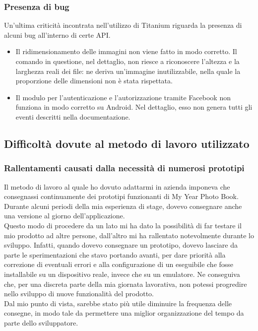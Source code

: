 			\subsubsection{Presenza di bug}
				Un'ultima criticità incontrata nell'utilizzo di Titanium riguarda la presenza di alcuni bug all'interno di certe API.
				\begin{itemize}
					\item Il ridimensionamento delle immagini non viene fatto in modo corretto. Il comando in questione, nel
					dettaglio, non riesce a riconoscere l'altezza e la larghezza reali dei file: ne deriva un'immagine
					inutilizzabile, nella quale la proporzione delle dimensioni non è stata rispettata.
					\item Il modulo per l'autenticazione e l'autorizzazione tramite Facebook non funziona in modo corretto su
					Android. Nel dettaglio, esso non genera tutti gli eventi descritti nella documentazione.
				\end{itemize}
		\subsection{Difficoltà dovute al metodo di lavoro utilizzato}
			\subsubsection{Rallentamenti causati dalla necessità di numerosi prototipi}
				Il metodo di lavoro al quale ho dovuto adattarmi in azienda imponeva che consegnassi continuamente dei prototipi
				funzionanti di My Year Photo Book. Durante alcuni periodi della mia esperienza di stage, dovevo consegnare anche una
				versione al giorno dell'applicazione.\\
				Questo modo di procedere da un lato mi ha dato la possibilità di far testare il mio prodotto ad altre persone,
				dall'altro mi ha rallentato notevolmente durante lo sviluppo. Infatti, quando dovevo consegnare un prototipo, dovevo
				lasciare da parte le sperimentazioni che stavo portando avanti, per dare priorità alla correzione di eventuali errori
				e alla configurazione di un eseguibile che fosse installabile su un dispositivo reale, invece che su un emulatore. Ne
				conseguiva che, per una discreta parte della mia giornata lavorativa, non potessi progredire nello sviluppo di nuove
				funzionalità del prodotto.\\
				Dal mio punto di vista, sarebbe stato più utile diminuire la frequenza delle consegne, in modo tale da permettere una miglior
				organizzazione del tempo da parte dello sviluppatore.
